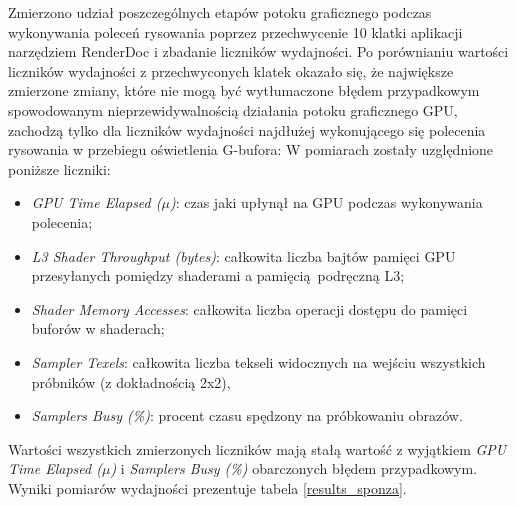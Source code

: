Zmierzono udział poszczególnych etapów potoku graficznego podczas wykonywania poleceń rysowania poprzez przechwycenie 10 klatki aplikacji narzędziem RenderDoc i zbadanie liczników wydajności.
Po porównianiu wartości liczników wydajności z przechwyconych klatek okazało się, że największe zmierzone zmiany, które nie mogą być wytłumaczone błędem przypadkowym spowodowanym nieprzewidywalnością działania potoku graficznego GPU, zachodzą tylko dla liczników wydajności najdłużej wykonującego się polecenia rysowania w przebiegu oświetlenia G-bufora:
W pomiarach zostały uzględnione poniższe liczniki:
\begin{itemize}
	\item \textit{GPU Time Elapsed ($\mu$)}: czas jaki upłynął na GPU podczas wykonywania polecenia;
	\item \textit{L3 Shader Throughput (bytes)}: całkowita liczba bajtów pamięci GPU przesyłanych pomiędzy shaderami a pamięcią podręczną L3;
	\item \textit{Shader Memory Accesses}: całkowita liczba operacji dostępu do pamięci buforów w shaderach;
	\item \textit{Sampler Texels}: całkowita liczba tekseli widocznych na wejściu wszystkich próbników (z dokładnością 2x2),
	\item \textit{Samplers Busy (\%)}: procent czasu spędzony na próbkowaniu obrazów.
\end{itemize}
Wartości wszystkich zmierzonych liczników mają stałą wartość z wyjątkiem \textit{GPU Time Elapsed ($\mu$)} i \textit{Samplers Busy (\%)} obarczonych błędem przypadkowym.
Wyniki pomiarów wydajności prezentuje tabela \ref{results_sponza}.
